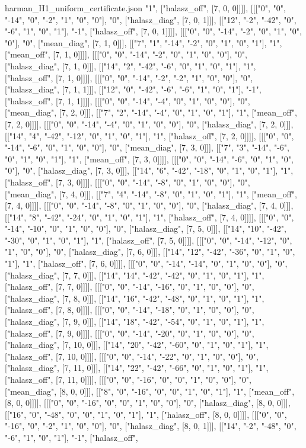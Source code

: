 \begin{filecontents*}[overwrite]{harman_H1_uniform_certificate.json}
"1", ["halasz_off", [7, 0, 0]]]], [[["0", "0", "-14", "0", "-2", "1", "0", "0"], "0", ["halasz_diag", [7, 0, 1]]], [["12", "-2", "-42", "0", "-6", "1", "0", "1"], "-1", ["halasz_off", [7, 0, 1]]]], [[["0", "0", "-14", "-2", "0", "1", "0", "0"], "0", ["mean_diag", [7, 1, 0]]], [["7", "1", "-14", "-2", "0", "1", "0", "1"], "1", ["mean_off", [7, 1, 0]]]], [[["0", "0", "-14", "-2", "0", "1", "0", "0"], "0", ["halasz_diag", [7, 1, 0]]], [["14", "2", "-42", "-6", "0", "1", "0", "1"], "1", ["halasz_off", [7, 1, 0]]]], [[["0", "0", "-14", "-2", "-2", "1", "0", "0"], "0", ["halasz_diag", [7, 1, 1]]], [["12", "0", "-42", "-6", "-6", "1", "0", "1"], "-1", ["halasz_off", [7, 1, 1]]]], [[["0", "0", "-14", "-4", "0", "1", "0", "0"], "0", ["mean_diag", [7, 2, 0]]], [["7", "2", "-14", "-4", "0", "1", "0", "1"], "1", ["mean_off", [7, 2, 0]]]], [[["0", "0", "-14", "-4", "0", "1", "0", "0"], "0", ["halasz_diag", [7, 2, 0]]], [["14", "4", "-42", "-12", "0", "1", "0", "1"], "1", ["halasz_off", [7, 2, 0]]]], [[["0", "0", "-14", "-6", "0", "1", "0", "0"], "0", ["mean_diag", [7, 3, 0]]], [["7", "3", "-14", "-6", "0", "1", "0", "1"], "1", ["mean_off", [7, 3, 0]]]], [[["0", "0", "-14", "-6", "0", "1", "0", "0"], "0", ["halasz_diag", [7, 3, 0]]], [["14", "6", "-42", "-18", "0", "1", "0", "1"], "1", ["halasz_off", [7, 3, 0]]]], [[["0", "0", "-14", "-8", "0", "1", "0", "0"], "0", ["mean_diag", [7, 4, 0]]], [["7", "4", "-14", "-8", "0", "1", "0", "1"], "1", ["mean_off", [7, 4, 0]]]], [[["0", "0", "-14", "-8", "0", "1", "0", "0"], "0", ["halasz_diag", [7, 4, 0]]], [["14", "8", "-42", "-24", "0", "1", "0", "1"], "1", ["halasz_off", [7, 4, 0]]]], [[["0", "0", "-14", "-10", "0", "1", "0", "0"], "0", ["halasz_diag", [7, 5, 0]]], [["14", "10", "-42", "-30", "0", "1", "0", "1"], "1", ["halasz_off", [7, 5, 0]]]], [[["0", "0", "-14", "-12", "0", "1", "0", "0"], "0", ["halasz_diag", [7, 6, 0]]], [["14", "12", "-42", "-36", "0", "1", "0", "1"], "1", ["halasz_off", [7, 6, 0]]]], [[["0", "0", "-14", "-14", "0", "1", "0", "0"], "0", ["halasz_diag", [7, 7, 0]]], [["14", "14", "-42", "-42", "0", "1", "0", "1"], "1", ["halasz_off", [7, 7, 0]]]], [[["0", "0", "-14", "-16", "0", "1", "0", "0"], "0", ["halasz_diag", [7, 8, 0]]], [["14", "16", "-42", "-48", "0", "1", "0", "1"], "1", ["halasz_off", [7, 8, 0]]]], [[["0", "0", "-14", "-18", "0", "1", "0", "0"], "0", ["halasz_diag", [7, 9, 0]]], [["14", "18", "-42", "-54", "0", "1", "0", "1"], "1", ["halasz_off", [7, 9, 0]]]], [[["0", "0", "-14", "-20", "0", "1", "0", "0"], "0", ["halasz_diag", [7, 10, 0]]], [["14", "20", "-42", "-60", "0", "1", "0", "1"], "1", ["halasz_off", [7, 10, 0]]]], [[["0", "0", "-14", "-22", "0", "1", "0", "0"], "0", ["halasz_diag", [7, 11, 0]]], [["14", "22", "-42", "-66", "0", "1", "0", "1"], "1", ["halasz_off", [7, 11, 0]]]], [[["0", "0", "-16", "0", "0", "1", "0", "0"], "0", ["mean_diag", [8, 0, 0]]], [["8", "0", "-16", "0", "0", "1", "0", "1"], "1", ["mean_off", [8, 0, 0]]]], [[["0", "0", "-16", "0", "0", "1", "0", "0"], "0", ["halasz_diag", [8, 0, 0]]], [["16", "0", "-48", "0", "0", "1", "0", "1"], "1", ["halasz_off", [8, 0, 0]]]], [[["0", "0", "-16", "0", "-2", "1", "0", "0"], "0", ["halasz_diag", [8, 0, 1]]], [["14", "-2", "-48", "0", "-6", "1", "0", "1"], "-1", ["halasz_off", 
\end{filecontents*}
